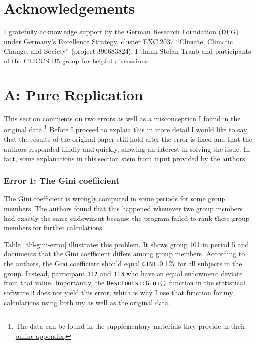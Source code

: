 \documentclass[
  authoryear,
  review,
  3p,
  onecolumn]{elsarticle}
\begin{document}
\hypertarget{acknowledgements}{%
\section{Acknowledgements}\label{acknowledgements}}

I gratefully acknowledge support by the German Research Foundation (DFG)
under Germany's Excellence Strategy, cluster EXC 2037 ``Climate,
Climatic Change, and Society'' (project 390683824). I thank Stefan Traub
and participants of the CLICCS B5 group for helpful discussions.

\newpage{}

\hypertarget{a-pure-replication}{%
\section{A: Pure Replication}\label{a-pure-replication}}

This section comments on two errors as well as a misconception I found
in the original data.\footnote{The data can be found in the
  supplementary materials they provide in their
  \href{https://www.sciencedirect.com/science/article/pii/S0047272717300361\#s0115}{online
  appendix}.} Before I proceed to explain this in more detail I would
like to say that the results of the original paper still hold after the
error is fixed and that the authors responded kindly and quickly,
showing an interest in solving the issue. In fact, some explanations in
this section stem from input provided by the authors.

\hypertarget{error-1-the-gini-coefficient}{%
\subsubsection{Error 1: The Gini
coefficient}\label{error-1-the-gini-coefficient}}

The Gini coefficient is wrongly computed in some periods for some group
members. The authors found that this happened whenever two group members
had exactly the same endowment because the program failed to rank these
group members for further calculations.

Table~\ref{tbl-gini-error} illustrates this problem. It shows group 101
in period 5 and documents that the Gini coefficient differs among group
members. According to the authors, the Gini coefficient should equal
\texttt{GINI=}0.127 for all subjects in the group. Instead, participant
\texttt{112} and \texttt{113} who have an equal endowment deviate from
that value. Importantly, the \texttt{DescTools::Gini()} function in the
statistical software \texttt{R} does not yield this error, which is why
I use that function for my calculations using both my as well as the
original data.
\end{document}
